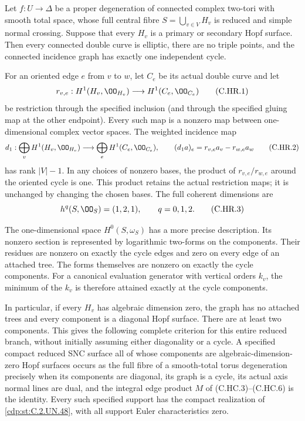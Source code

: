 
\begin{proposition}\label{cdp:st:C.2.UN.54}
Let $f:U\to\Delta$ be a proper degeneration of connected complex
two-tori with smooth total space, whose full central fibre
$S=\bigcup_{v\in V}H_v$ is reduced and simple normal crossing.
Suppose that every $H_v$ is a primary or secondary Hopf surface.
Then every connected double curve is elliptic, there are no triple
points, and the connected incidence graph has exactly one independent
cycle.

For an oriented edge $e$ from $v$ to $w$, let $C_e$ be its actual
double curve and let
\[
 r_{v,e}:H^1(H_v,\OO_{H_v})\longrightarrow H^1(C_e,\OO_{C_e})
                                                        \tag{C.HR.1}\label{cdp:eq:C.HR.1}
\]
be restriction through the specified inclusion (and through the
specified gluing map at the other endpoint). Every such map is a
nonzero map between one-dimensional complex vector spaces. The
weighted incidence map
\[
 d_1:\bigoplus_vH^1(H_v,\OO_{H_v})
       \longrightarrow\bigoplus_eH^1(C_e,\OO_{C_e}),\qquad
 (d_1a)_e=r_{v,e}a_v-r_{w,e}a_w
                                                        \tag{C.HR.2}\label{cdp:eq:C.HR.2}
\]
has rank $|V|-1$. In any choices of nonzero bases, the product of
$r_{v,e}/r_{w,e}$ around the oriented cycle is one. This product
retains the actual restriction maps; it is unchanged by changing
the chosen bases. The full coherent dimensions are
\[
                    h^q(S,\OO_S)=(1,2,1),\qquad q=0,1,2.
                                                        \tag{C.HR.3}\label{cdp:eq:C.HR.3}
\]

The one-dimensional space $H^0(S,\omega_S)$ has a more precise
description. Its nonzero section is represented by logarithmic
two-forms on the components. Their residues are nonzero on exactly
the cycle edges and zero on every edge of an attached tree. The
forms themselves are nonzero on exactly the cycle components.
For a canonical evaluation generator with vertical orders $k_v$,
the minimum of the $k_v$ is therefore attained exactly at the
cycle components.

In particular, if every $H_v$ has algebraic dimension zero, the
graph has no attached trees and every component is a diagonal Hopf
surface. There are at least two components. This gives the following
complete criterion for this entire reduced branch, without initially
assuming either diagonality or a cycle. A specified compact reduced
SNC surface all of whose components are algebraic-dimension-zero
Hopf surfaces occurs as the full fibre of a smooth-total torus
degeneration precisely when its components are diagonal, its graph
is a cycle, its actual axis normal lines are dual, and the integral
edge product $M$ of (C.HC.3)--(C.HC.6) is the identity. Every such
specified support has the compact realization of \ref{cdp:st:C.2.UN.48}, with
all support Euler characteristics zero.
\end{proposition}

